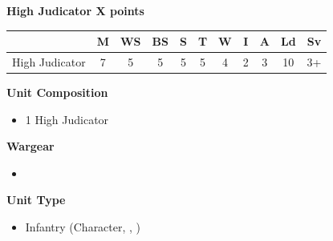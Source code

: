 \newpage
\subsubsection[Triarch High Judicator]{}

\hspace{0.5em}
\begin{minipage}[t]{0.72\textwidth}
	{\large \textbf{High Judicator \dotfill X points}}
	
	\begin{tabular}{m{160 pt} *{10}{c}}
		& M & WS & BS & S & T & W & I & A & Ld & Sv \\
		\hline
		High Judicator & 7 & 5 & 5 & 5 & 5 & 4 & 2 & 3 & 10 & 3+ \\
	\end{tabular}
	\small
	\begin{minipage}[t]{0.5\textwidth}
		\begin{flushleft}
			\vspace*{2em}
			\textbf{Unit Composition}
			\begin{itemize}
				\item 1 High Judicator
			\end{itemize}
			
			\textbf{Wargear}
			\begin{itemize}
				\item {}
			\end{itemize}
		\end{flushleft}
	\end{minipage}
	\begin{minipage}[t]{0.5\textwidth}
		\begin{flushleft}
			\vspace*{2em}
			\textbf{Unit Type}
			\begin{itemize}
				\item Infantry (Character, , \quickref{Noble})
			\end{itemize}
			

\end{flushleft}
\end{minipage}
\end{minipage}
